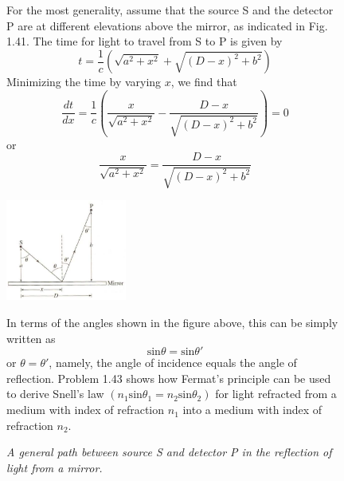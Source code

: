 \documentclass[11pt,letterpaper,boxed, noheader]{pset}
\begin{document}
    \begin{figure} [ht]
    \begin{solution}
        For the most generality, assume that the source S and the detector P are at different elevations above the mirror, as indicated in Fig. 1.41. The time for light to travel from S to P is given by 
        \[ t = \frac{1}{c} (\sqrt{a^2 + x^2} + \sqrt{(D-x)^2 + b^2}) \]
        Minimizing the time by varying $x$, we find that
        \[ \frac{dt}{dx} = \frac{1}{c} (\frac{x}{\sqrt{a^2+x^2}} - \frac{D-x}{\sqrt{(D-x)^2 + b^2}}) = 0 \]
        or
        \[ \frac{x}{\sqrt{a^2+x^2}} = \frac{D-x}{\sqrt{(D-x)^2 + b^2}}\]
        
        \begin{center}
            \includegraphics[width=150px]{HW15Images/Ex1-11.png}
            \captionsetup{labelformat=empty} \caption*{\textit{A general path between source S and detector P in the reflection of light from a mirror.}}
        \end{center}
        
        \bigskip
        In terms of the angles shown in the figure above, this can be simply written as 
        \[ \text{sin}\theta = \text{sin}\theta' \]
        or $\theta = \theta'$, namely, the angle of incidence equals the angle of reflection. Problem 1.43 shows how Fermat's principle can be used to derive Snell's law $(n_1 \text{sin}\theta_1 = n_2 \text{sin}\theta_2)$ for light refracted from a medium with index of refraction $n_1$ into a medium with index of refraction $n_2$.
    \end{solution}
    \end{figure}
\end{document}
